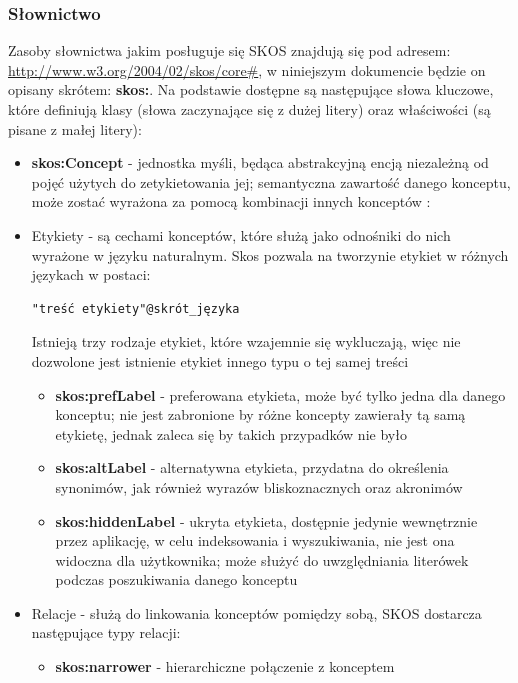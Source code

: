 \subsubsection{Słownictwo}
Zasoby słownictwa jakim posługuje się SKOS znajdują się pod adresem:
\url{http://www.w3.org/2004/02/skos/core#}, w niniejszym dokumencie będzie on
opisany skrótem: \textbf{skos:}. Na podstawie \cite{SKOS-pr} dostępne są
następujące słowa kluczowe, które definiują klasy (słowa zaczynające się z
dużej litery) oraz właściwości (są pisane z małej litery):
\begin{itemize}
  \item \textbf{skos:Concept} - jednostka myśli, będąca abstrakcyjną encją
    niezależną od pojęć użytych do zetykietowania jej; semantyczna zawartość
    danego konceptu, może zostać wyrażona za pomocą kombinacji innych konceptów
    \cite{Willpower}:
  \item Etykiety - są cechami konceptów, które służą jako odnośniki do nich
    wyrażone w języku naturalnym. Skos pozwala na tworzynie etykiet w różnych
    językach w postaci:
\begin{verbatim}
"treść etykiety"@skrót_języka
\end{verbatim}
    Istnieją trzy rodzaje etykiet, które wzajemnie się wykluczają, więc nie
    dozwolone jest istnienie etykiet innego typu o tej samej treści
    \begin{itemize}
      \item \textbf{skos:prefLabel} - preferowana etykieta, może być tylko
        jedna dla danego konceptu; nie jest zabronione by różne koncepty
        zawierały tą samą etykietę, jednak zaleca się by takich przypadków
        nie było
      \item \textbf{skos:altLabel} - alternatywna etykieta, przydatna do
        określenia synonimów, jak również wyrazów bliskoznacznych oraz
        akronimów
      \item \textbf{skos:hiddenLabel} - ukryta etykieta, dostępnie jedynie
        wewnętrznie przez aplikację, w celu indeksowania i wyszukiwania, nie
        jest ona widoczna dla użytkownika; może służyć do uwzględniania
        literówek podczas poszukiwania danego konceptu
    \end{itemize}
  \item Relacje - służą do linkowania konceptów pomiędzy sobą, SKOS dostarcza
    następujące typy relacji:
    \begin{itemize}
      \item \textbf{skos:narrower} - hierarchiczne połączenie z konceptem

\end{itemize}
\end{itemize}
